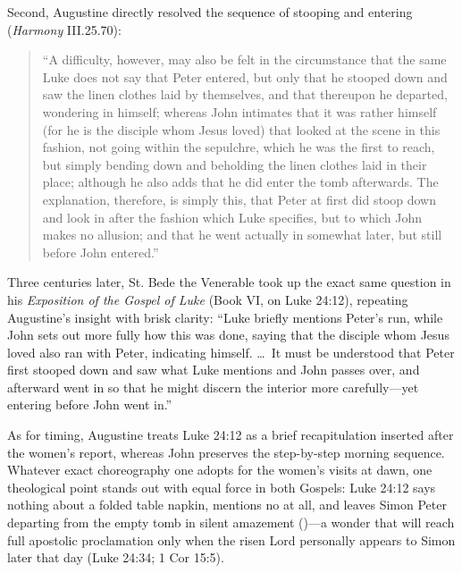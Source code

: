 Second, Augustine directly resolved the sequence of stooping and entering (\emph{Harmony} III.25.70):
\begin{quote}
``A difficulty, however, may also be felt in the circumstance that the same Luke does not say that Peter entered, but only that he stooped down and saw the linen clothes laid by themselves, and that thereupon he departed, wondering in himself; whereas John intimates that it was rather himself (for he is the disciple whom Jesus loved) that looked at the scene in this fashion, not going within the sepulchre, which he was the first to reach, but simply bending down and beholding the linen clothes laid in their place; although he also adds that he did enter the tomb afterwards. The explanation, therefore, is simply this, that Peter at first did stoop down and look in after the fashion which Luke specifies, but to which John makes no allusion; and that he went actually in somewhat later, but still before John entered.''
\end{quote}

Three centuries later, St. Bede the Venerable took up the exact same question in his \emph{Exposition of the Gospel of Luke} (Book VI, on Luke 24:12), repeating Augustine's insight with brisk clarity: ``Luke briefly mentions Peter's run, while John sets out more fully how this was done, saying that the disciple whom Jesus loved also ran with Peter, indicating himself. \dots\ It must be understood that Peter first stooped down and saw what Luke mentions and John passes over, and afterward went in so that he might discern the interior more carefully---yet entering before John went in.''

As for timing, Augustine treats Luke 24:12 as a brief recapitulation inserted after the women's report, whereas John preserves the step-by-step morning sequence. Whatever exact choreography one adopts for the women's visits at dawn, one theological point stands out with equal force in both Gospels: Luke 24:12 says nothing about a folded table napkin, mentions no  at all, and leaves Simon Peter departing from the empty tomb in silent amazement ()---a wonder that will reach full apostolic proclamation only when the risen Lord personally appears to Simon later that day (Luke 24:34; 1 Cor 15:5).

